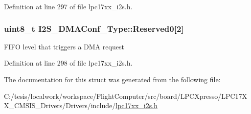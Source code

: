 \-Definition at line 297 of file lpc17xx\-\_\-i2s.\-h.

\hypertarget{struct_i2_s___d_m_a_conf___type_a096168376e1599d2e2b1992e34ed2faf}{
\subsubsection[{\-Reserved0}]{\setlength{\rightskip}{0pt plus 5cm}uint8\-\_\-t {\bf \-I2\-S\-\_\-\-D\-M\-A\-Conf\-\_\-\-Type\-::\-Reserved0}\mbox{[}2\mbox{]}}}\label{struct_i2_s___d_m_a_conf___type_a096168376e1599d2e2b1992e34ed2faf}
\-F\-I\-F\-O level that triggers a \-D\-M\-A request 

\-Definition at line 298 of file lpc17xx\-\_\-i2s.\-h.



\-The documentation for this struct was generated from the following file\-:\begin{DoxyCompactItemize}
\item 
\-C\-:/tesis/localwork/workspace/\-Flight\-Computer/src/board/\-L\-P\-C\-Xpresso/\-L\-P\-C17\-X\-X\-\_\-\-C\-M\-S\-I\-S\-\_\-\-Drivers/\-Drivers/include/\hyperlink{lpc17xx__i2s_8h}{lpc17xx\-\_\-i2s.\-h}\end{DoxyCompactItemize}
